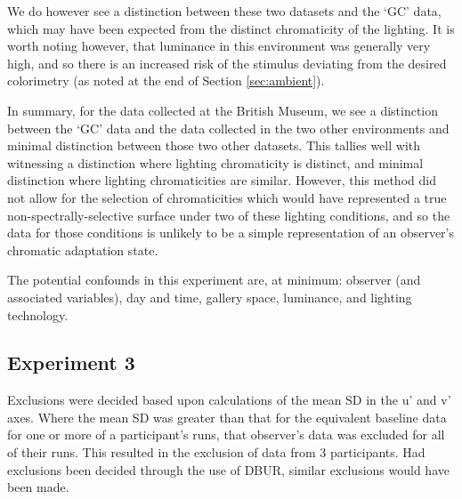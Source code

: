 We do however see a distinction between these two datasets and the `GC' data, which may have been expected from the distinct chromaticity of the lighting. It is worth noting however, that luminance in this environment was generally very high, and so there is an increased risk of the stimulus deviating from the desired colorimetry (as noted at the end of Section \ref{sec:ambient}).

In summary, for the data collected at the British Museum, we see a distinction between the `GC' data and the data collected in the two other environments and minimal distinction between those two other datasets. This tallies well with witnessing a distinction where lighting chromaticity is distinct, and minimal distinction where lighting chromaticities are similar. However, this method did not allow for the selection of chromaticities which would have represented a true non-spectrally-selective surface under two of these lighting conditions, and so the data for those conditions is unlikely to be a simple representation of an observer's chromatic adaptation state.

The potential confounds in this experiment are, at minimum: observer (and associated variables), day and time, gallery space, luminance, and lighting technology.

\clearpage

\subsection{Experiment 3}

Exclusions were decided based upon calculations of the mean SD in the u' and v' axes. Where the mean SD was greater than that for the equivalent baseline data for one or more of a participant's runs, that observer's data was excluded for all of their runs. This resulted in the exclusion of data from 3 participants. Had exclusions been decided through the use of \gls{DBUR}, similar exclusions would have been made.

